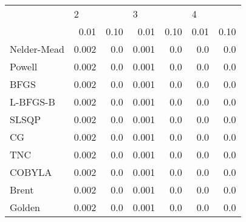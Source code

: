 \begin{tabular}{lrrrrrr}
\toprule
{} & \multicolumn{2}{l}{2} & \multicolumn{2}{l}{3} & \multicolumn{2}{l}{4} \\
{} &   0.01 & 0.10 &   0.01 & 0.10 & 0.01 & 0.10 \\
\midrule
Nelder-Mead &  0.002 &  0.0 &  0.001 &  0.0 &  0.0 &  0.0 \\
Powell      &  0.002 &  0.0 &  0.001 &  0.0 &  0.0 &  0.0 \\
BFGS        &  0.002 &  0.0 &  0.001 &  0.0 &  0.0 &  0.0 \\
L-BFGS-B    &  0.002 &  0.0 &  0.001 &  0.0 &  0.0 &  0.0 \\
SLSQP       &  0.002 &  0.0 &  0.001 &  0.0 &  0.0 &  0.0 \\
CG          &  0.002 &  0.0 &  0.001 &  0.0 &  0.0 &  0.0 \\
TNC         &  0.002 &  0.0 &  0.001 &  0.0 &  0.0 &  0.0 \\
COBYLA      &  0.002 &  0.0 &  0.001 &  0.0 &  0.0 &  0.0 \\
Brent       &  0.002 &  0.0 &  0.001 &  0.0 &  0.0 &  0.0 \\
Golden      &  0.002 &  0.0 &  0.001 &  0.0 &  0.0 &  0.0 \\
\bottomrule
\end{tabular}
